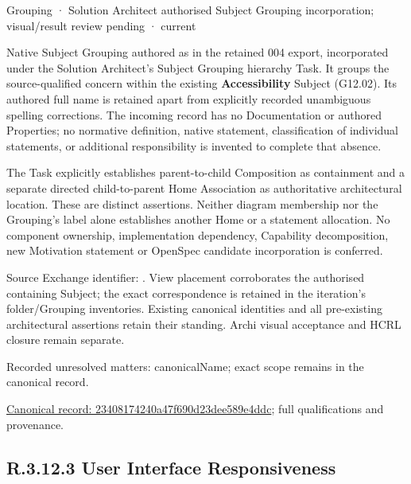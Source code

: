\label{element:23408174240a47f690d23dee589e4ddc}
{\small Grouping · Solution Architect authorised Subject Grouping incorporation; visual/result review pending · current}\par

Native Subject Grouping authored as \texttt{} in the retained 004 export,
incorporated under the Solution Architect's Subject Grouping hierarchy Task.
It groups the source-qualified \texttt{} concern within
the existing \textbf{Accessibility} Subject (G12.02). Its authored full name
is retained apart from explicitly recorded unambiguous spelling corrections.
The incoming record has no Documentation or authored Properties; no normative
definition, native statement, classification of individual statements, or
additional responsibility is invented to complete that absence.



The Task explicitly establishes parent-to-child Composition as containment and
a separate directed child-to-parent Home Association as authoritative architectural
location. These are distinct assertions. Neither diagram membership nor the
Grouping's label alone establishes another Home or a statement allocation.
No component ownership, implementation dependency, Capability decomposition,
new Motivation statement or OpenSpec candidate incorporation is conferred.



Source Exchange identifier: \texttt{}. View placement corroborates
the authorised containing Subject; the exact correspondence is retained in the
iteration's folder/Grouping inventories. Existing canonical identities and all
pre-existing architectural assertions retain their standing. Archi visual
acceptance and HCRL closure remain separate.


{\small Recorded unresolved matters: canonicalName; exact scope remains in the canonical record.}\par
{\footnotesize \href{../../../../continuum/grouping/23408174240a47f690d23dee589e4ddc.md}{Canonical record: 23408174240a47f690d23dee589e4ddc}; full qualifications and provenance.}\par
\subsection*{R.3.12.3 User Interface Responsiveness}
\label{navigation:R.3.12.3}


